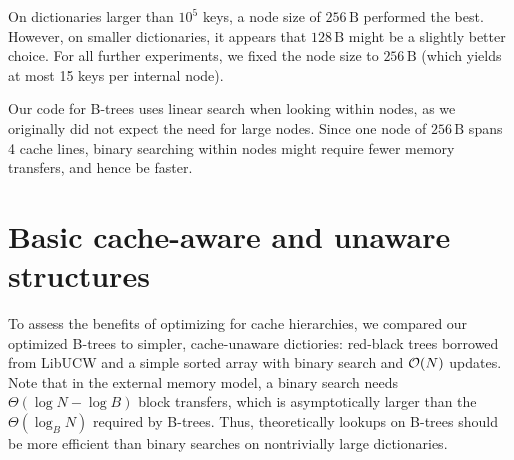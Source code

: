 On dictionaries larger than $10^5$ keys, a node size of $256\,\text{B}$
performed the best. However, on smaller dictionaries, it appears that
$128\,\text{B}$ might be a slightly better choice.
For all further experiments, we fixed the node size to $256\,\text{B}$
(which yields at most 15 keys per internal node).

Our code for B-trees uses linear search when looking within nodes,
as we originally did not expect the need for large nodes.
Since one node of $256\,\text{B}$ spans 4 cache lines, binary searching
within nodes might require fewer memory transfers, and hence be faster.

\section{Basic cache-aware and unaware structures}
To assess the benefits of optimizing for cache hierarchies, we compared
our optimized B-trees to simpler, cache-unaware dictiories:
red-black trees borrowed from LibUCW and a simple sorted array with binary
search and $\mathcal{O}(N)$ updates.
Note that in the external memory model, a binary search needs
$\Theta(\log N-\log B)$ block transfers, which is asymptotically larger than
the $\Theta(\log_B N)$ required by B-trees. Thus, theoretically lookups
on B-trees should be more efficient than binary searches on nontrivially
large dictionaries.

